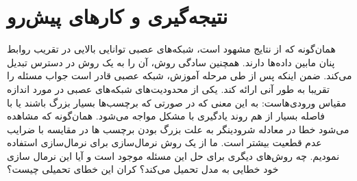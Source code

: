 \section*{نتیجه‌گیری و کارهای پیش‌رو}
همان‌گونه که از نتایج مشهود است، شبکه‌های عصبی توانایی بالایی در تقریب روابط پنان مابین داده‌ها دارند. همچنین سادگی روش، آن را به یک روش در دسترس تبدیل می‌کند. ضمن اینکه پس از طی مرحله آموزش، شبکه عصبی قادر است جواب مسئله را تقریبا به طور آنی ارائه کند. یکی از محدودیت‌های شبکه‌های عصبی در مورد اندازه مقیاس ورودی‌هاست: به این معنی که در صورتی که برچسب‌ها بسیار بزرگ باشند یا با فاصله بسیار از هم روند یادگیری با مشکل مواجه می‌شود. همان‌گونه که مشاهده می‌شود خطا در معادله شرودینگر به علت بزرگ بودن برچسب ها در مقایسه با ضرایب عدم قطعیت بیشتر است. ما از یک روش نرمال‌سازی برای نرمال‌سازی استفاده نمودیم. چه روش‌های دیگری برای حل این مسئله موجود است و آیا این نرمال سازی خود خطایی به مدل تحمیل می‌کند؟ کران این خطای تحمیلی چیست؟
\clearpage
\newpage